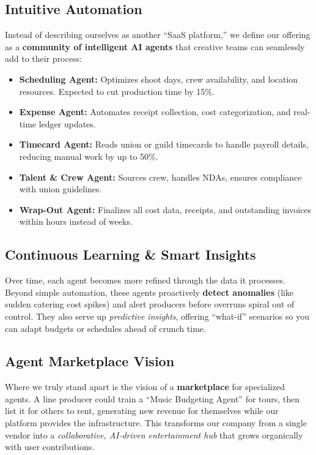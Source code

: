 \documentclass[11pt]{article}
\begin{document}
\subsection{Intuitive Automation}
Instead of describing ourselves as another “SaaS platform,” we define our offering as a \textbf{community of intelligent AI agents} that creative teams can seamlessly add to their process:
\begin{itemize}
    \item \textbf{Scheduling Agent:} Optimizes shoot days, crew availability, and location resources. Expected to cut production time by 15\%.
    \item \textbf{Expense Agent:} Automates receipt collection, cost categorization, and real-time ledger updates.
    \item \textbf{Timecard Agent:} Reads union or guild timecards to handle payroll details, reducing manual work by up to 50\%.
    \item \textbf{Talent \& Crew Agent:} Sources crew, handles NDAs, ensures compliance with union guidelines.
    \item \textbf{Wrap-Out Agent:} Finalizes all cost data, receipts, and outstanding invoices within hours instead of weeks.
\end{itemize}

\subsection{Continuous Learning \& Smart Insights}
Over time, each agent becomes more refined through the data it processes. Beyond simple automation, these agents proactively \textbf{detect anomalies} (like sudden catering cost spikes) and alert producers before overruns spiral out of control. They also serve up \textit{predictive insights}, offering “what-if” scenarios so you can adapt budgets or schedules ahead of crunch time.

\subsection{Agent Marketplace Vision}
Where we truly stand apart is the vision of a \textbf{marketplace} for specialized agents. A line producer could train a “Music Budgeting Agent” for tours, then list it for others to rent, generating new revenue for themselves while our platform provides the infrastructure. This transforms our company from a single vendor into a \textit{collaborative, AI-driven entertainment hub} that grows organically with user contributions.
\end{document}
